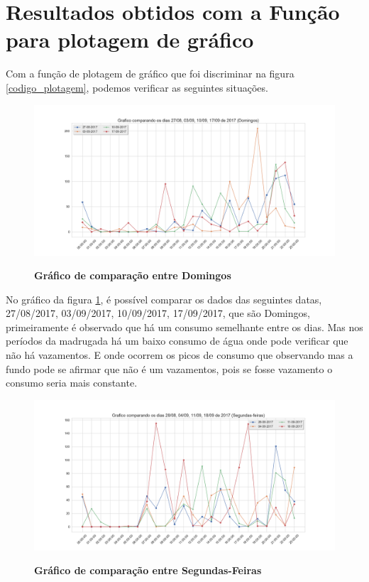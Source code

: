\section{Resultados obtidos com a Função para plotagem de gráfico }
\par Com a função de plotagem de gráfico que foi discriminar na figura \ref{codigo_plotagem}, podemos verificar as seguintes situações. 

\begin{figure}[ht]
	\caption{\textbf{Gráfico de comparação entre Domingos}}
	\centering
		\includegraphics[width=\textwidth,height=\textheight , keepaspectratio]{figuras/Graficocomparandoosdias27-08,03-09,10-09,17-09de2017(Domingos)}
		\label{graf_dom}
\end{figure}

\par No gráfico da figura \ref{graf_dom}, é possível comparar os dados das seguintes datas, 27/08/2017, 03/09/2017, 10/09/2017, 17/09/2017, que são Domingos, primeiramente é observado que há um consumo semelhante entre os dias. Mas nos períodos da madrugada há um baixo consumo de água onde pode verificar  que não há vazamentos. E onde ocorrem os picos de consumo que observando mas a fundo pode se afirmar que não é um vazamentos, pois se fosse vazamento o consumo seria mais constante.  

\begin{figure}[ht]
	\caption{\textbf{Gráfico de comparação entre Segundas-Feiras}}
	\centering
		\includegraphics[width=\textwidth,height=\textheight , keepaspectratio]{figuras/Graficocomparandoosdias28-08,04-09,11-09,18-09de2017(Segundas-feiras)}
		\label{graf_seg}
\end{figure}

